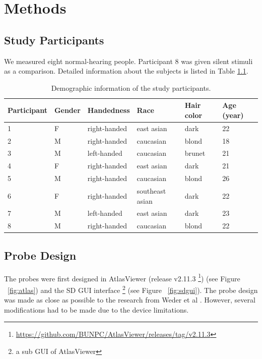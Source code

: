 \chapter{Methods}
\section {Study Participants}
We measured eight normal-hearing people. Participant 8 was given silent stimuli as a comparison. Detailed information about the subjects is listed in Table \ref{table:1}.

\begin{table}[h!]
   \centering

    \begin{tabular}{p{2.3cm} | p{1.5cm} |p{2.5cm} | p{2.8cm} | p{2.1cm} | p{2.2cm}} %
      \textbf{Participant} & \textbf {Gender}& \textbf{Handedness} & \textbf{Race} & \textbf{Hair color} &\textbf {Age (year)}\\ 
      \hline
      1 & F & right-handed & east asian & dark & 22\\
      2 & M & right-handed  & caucasian & blond & 18 \\
      3 & M & left-handed &  caucasian & brunet & 21\\
      4 & F  & right-handed & east asian & dark& 21 \\
      5 & M & right-handed  &  caucasian& blond & 26 \\
      6 &  F & right-handed & southeast asian & dark & 22 \\
      7 &  M & left-handed &  east asian & dark & 23 \\
      8 & M & right-handed  & caucasian & blond & 22 \\
    \end{tabular}
    
    \caption{Demographic information of the study participants.}
    \label{table:1}
\end{table}

\section {Probe Design}
The probes were first designed in AtlasViewer (release v2.11.3 \footnote{\url{https://github.com/BUNPC/AtlasViewer/releases/tag/v2.11.3}})  (see Figure ~\ref{fig:atlas}) \citep {10.1117/1.NPh.2.2.020801} and the SD GUI interface \footnote{a sub GUI of AtlasViewer} (see Figure ~\ref{fig:sdgui}). The probe design was made as close as possible to the research from Weder et al \citeyearpar{Weder2018}. However, several modifications had to be made due to the device limitations.



